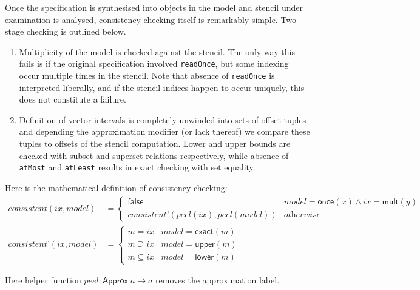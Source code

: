 \documentclass[acmlarge,review]{acmart}
\theoremstyle{definition}
\theoremstyle{plain}
\theoremstyle{remark}
\begin{document}
Once the specification is synthesised into objects in the model and stencil
under examination is analysed, consistency checking itself is remarkably simple.
Two stage checking is outlined below.

\begin{enumerate}
  \item Multiplicity of the model is checked against the stencil. The only way
    this fails is if the original specification involved \texttt{readOnce}, but
    some indexing occur multiple times in the stencil.  Note that absence of
    \texttt{readOnce} is interpreted liberally, and if the stencil indices
    happen to occur uniquely, this does not constitute a failure.
  \item Definition of vector intervals is completely unwinded into sets of
    offset tuples and depending the approximation modifier (or lack thereof)
    we compare these tuples to offsets of the stencil computation. Lower and
    upper bounds are checked with subset and superset relations respectively,
    while absence of \texttt{atMost} and \texttt{atLeast} results in exact
    checking with set equality.
\end{enumerate}

Here is the mathematical definition of consistency checking:
\begin{align*}
  \textit{consistent}(\textit{ix}, \textit{model}) & = \begin{cases}
    \mathsf{false} & \textit{model} = \mathsf{once}(x) \wedge ix = \mathsf{mult}(y) \\
    \textit{consistent'}(\textit{peel}(ix), \textit{peel}(model)) & \textit{otherwise}
  \end{cases} \\
%
  \textit{consistent'}(\textit{ix}, \textit{model}) & = \begin{cases}
    m = ix & \textit{model} = \mathsf{exact}(m) \\
    m \supseteq ix & \textit{model} = \mathsf{upper}(m) \\
    m \subseteq ix & \textit{model} = \mathsf{lower}(m)
  \end{cases}
\end{align*}

Here helper function $\textit{peel} : \mathsf{Approx} \; a \to a$ removes the
approximation label.

\end{document}
